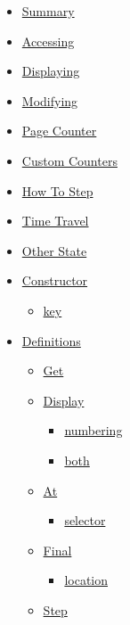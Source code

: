 \begin{itemize}
\tightlist
\item
  \hyperref[summary]{Summary}
\item
  \hyperref[accessing]{Accessing}
\item
  \hyperref[displaying]{Displaying}
\item
  \hyperref[modifying]{Modifying}
\item
  \hyperref[page-counter]{Page Counter}
\item
  \hyperref[custom-counters]{Custom Counters}
\item
  \hyperref[how-to-step]{How To Step}
\item
  \hyperref[time-travel]{Time Travel}
\item
  \hyperref[other-state]{Other State}
\item
  \hyperref[constructor]{Constructor}

  \begin{itemize}
  \tightlist
  \item
    \hyperref[constructor-key]{key}
  \end{itemize}
\item
  \hyperref[definitions]{Definitions}

  \begin{itemize}
  \tightlist
  \item
    \hyperref[definitions-get]{Get}
  \item
    \hyperref[definitions-display]{Display}

    \begin{itemize}
    \tightlist
    \item
      \hyperref[definitions-display-numbering]{numbering}
    \item
      \hyperref[definitions-display-both]{both}
    \end{itemize}
  \item
    \hyperref[definitions-at]{At}

    \begin{itemize}
    \tightlist
    \item
      \hyperref[definitions-at-selector]{selector}
    \end{itemize}
  \item
    \hyperref[definitions-final]{Final}

    \begin{itemize}
    \tightlist
    \item
      \hyperref[definitions-final-location]{location}
    \end{itemize}
  \item
    \hyperref[definitions-step]{Step}


\end{itemize}
\end{itemize}

